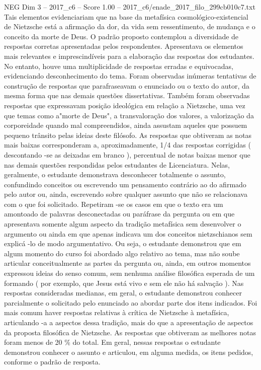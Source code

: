 \begin{textsample}{NEG Dim 3 – 2017\_c6 – Score 1.00 – 2017\_c6/enade\_2017\_filo\_299cb010c7.txt}
Tais elementos evidenciariam que na base da metafísica cosmológico-existencial de Nietzsche está a afirmação da dor, da vida sem ressentimento, de mudança e o conceito da morte de Deus.
O padrão proposto contemplou a diversidade de respostas corretas apresentadas pelos respondentes.
Apresentava os elementos mais relevantes e imprescindíveis para a elaboração das respostas dos estudantes.
No entanto, houve uma multiplicidade de respostas erradas e equivocadas, evidenciando desconhecimento do tema.
Foram observadas inúmeras tentativas de construção de respostas que parafraseavam o enunciado ou o texto do autor, da mesma forma que nas demais questões dissertativas.
Também foram observadas respostas que expressavam posição ideológica em relação a Nietzsche, uma vez que temas como a"morte de Deus", a transvaloração dos valores, a valorização da corporeidade quando mal compreendidos, ainda assustam aqueles que possuem pequeno trânsito pelas ideias deste filósofo.
As respostas que obtiveram as notas mais baixas corresponderam a, aproximadamente, 1/4 das respostas corrigidas ( descontando -se as deixadas em branco ), percentual de notas baixas menor que nas demais questões respondidas pelos estudantes de Licenciatura.
Nelas, geralmente, o estudante demonstrava desconhecer totalmente o assunto, confundindo conceitos ou escrevendo um pensamento contrário ao do afirmado pelo autor ou, ainda, escrevendo sobre qualquer assunto que não se relacionava com o que foi solicitado.
Repetiram -se os casos em que o texto era um amontoado de palavras desconectadas ou paráfrase da pergunta ou em que apresentava somente algum aspecto da tradição metafísica sem desenvolver o argumento ou ainda em que apenas indicava um dos conceitos nietzschianos sem explicá -lo de modo argumentativo.
Ou seja, o estudante demonstrou que em algum momento do curso foi abordado algo relativo ao tema, mas não soube articular conceitualmente as partes da pergunta ou, ainda, em outros momentos expressou ideias do senso comum, sem nenhuma análise filosófica esperada de um formando ( por exemplo, que Jesus está vivo e sem ele não há salvação ).
Nas respostas consideradas medianas, em geral, o estudante demonstrou conhecer parcialmente o solicitado pelo enunciado ao abordar parte dos itens indicados.
Foi mais comum haver respostas relativas à crítica de Nietzsche à metafísica, articulando -a a aspectos dessa tradição, mais do que a apresentação de aspectos da proposta filosófica de Nietzsche.
As respostas que obtiveram as melhores notas foram menos de 20 \% do total.
Em geral, nessas respostas o estudante demonstrou conhecer o assunto e articulou, em alguma medida, os itens pedidos, conforme o padrão de resposta.

\end{textsample}
